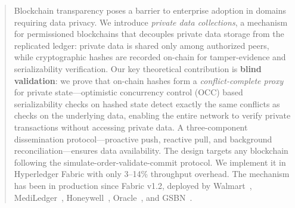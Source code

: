 \begin{abstract}
Blockchain transparency poses a barrier to enterprise adoption in domains requiring data privacy. We introduce \textit{private data collections}, a mechanism for permissioned blockchains that decouples private data storage from the replicated ledger: private data is shared only among authorized peers, while cryptographic hashes are recorded on-chain for tamper-evidence and serializability verification. Our key theoretical contribution is \textbf{blind validation}: we prove that on-chain hashes form a \textit{conflict-complete proxy} for private state---optimistic concurrency control (OCC) based serializability checks on hashed state detect exactly the same conflicts as checks on the underlying data, enabling the entire network to verify private transactions without accessing private data. A three-component dissemination protocol---proactive push, reactive pull, and background reconciliation---ensures data availability. The design targets any blockchain following the simulate-order-validate-commit protocol. We implement it in Hyperledger Fabric with only 3--14\% throughput overhead. The mechanism has been in production since Fabric v1.2, deployed by Walmart~\cite{7-to-2, walmart-hf}, MediLedger~\cite{mediledger-fda, mediledger-hf}, Honeywell~\cite{honeywell}, Oracle~\cite{oracle-cbdc}, and GSBN~\cite{gsbn}.
\end{abstract}
